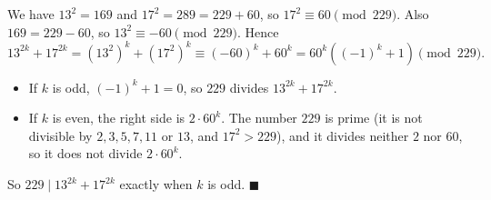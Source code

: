We have $13^2=169$ and $17^2=289=229+60$, so $17^2\equiv60\pmod{229}$. Also $169=229-60$, so $13^2\equiv-60\pmod{229}$. Hence
\[
13^{2k}+17^{2k}=\left(13^2\right)^k+\left(17^2\right)^k\equiv(-60)^k+60^k=60^k\left((-1)^k+1\right)\pmod{229}.
\]
\begin{itemize}
\item If $k$ is odd, $(-1)^k+1=0$, so $229$ divides $13^{2k}+17^{2k}$.
\item If $k$ is even, the right side is $2\cdot60^k$. The number $229$ is prime (it is not divisible by $2,3,5,7,11$ or $13$, and $17^2>229$), and it divides neither $2$ nor $60$, so it does not divide $2\cdot60^k$.
\end{itemize}
So $229\mid13^{2k}+17^{2k}$ exactly when $k$ is odd. $\blacksquare$
